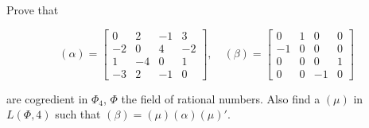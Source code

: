 Prove that

$$(\alpha) = \begin{bmatrix} 0 & 2 & -1 & 3 \\ -2 & 0 & 4 & -2 \\ 1 & -4 & 0 & 1 \\ -3 & 2 & -1 & 0 \end{bmatrix}, \quad (\beta) = \begin{bmatrix} 0 & 1 & 0 & 0 \\ -1 & 0 & 0 & 0 \\ 0 & 0 & 0 & 1 \\ 0 & 0 & -1 & 0 \end{bmatrix}$$

are cogredient in $\Phi_4$, $\Phi$ the field of rational numbers. Also find a $(\mu)$ in $L(\Phi, 4)$ such that $(\beta) = (\mu)(\alpha)(\mu)'$.
